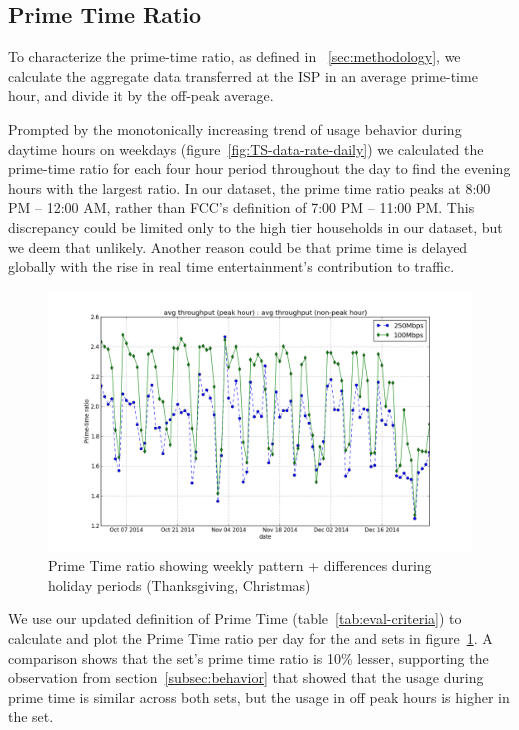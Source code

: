 \subsection{Prime Time Ratio}
\label{subsec:primetime}

To characterize the prime-time ratio, as defined in ~\ref{sec:methodology}, we
calculate the aggregate data transferred at the ISP in an average prime-time hour,
and divide it by the off-peak average.

Prompted by the monotonically increasing trend of usage behavior during daytime hours on
weekdays (figure~\ref{fig:TS-data-rate-daily})
we calculated the prime-time ratio for each four hour period throughout the day
to find the evening hours with the largest ratio.
In our dataset, the prime time ratio peaks at 8:00 PM -- 12:00 AM,
rather than FCC's definition of 7:00 PM -- 11:00 PM. This discrepancy could be limited
only to the high tier households in our dataset, but we deem that unlikely.
Another reason could be that prime time is delayed globally with the rise in real
time entertainment's contribution to traffic.

\begin{figure}[ht!]
\begin{minipage}{\linewidth}
\centering
\includegraphics[width=\linewidth]{figures/prime-time-ratio-by-date[replace].png}
\caption{Prime Time ratio showing weekly pattern + differences during holiday periods (Thanksgiving, Christmas)}
\label{fig:TS-prime-time-ratio}
\end{minipage}
\end{figure}

We use our updated definition of Prime Time (table~\ref{tab:eval-criteria}) to calculate and plot
the Prime Time ratio per day for the \test and \control sets in
figure~\ref{fig:TS-prime-time-ratio}. A comparison shows that
the \test set's prime time ratio is 10\% lesser, supporting the observation from
section~\ref{subsec:behavior} that showed that the usage during prime time is similar
across both sets, but the usage in off peak hours is higher in the \test set.

